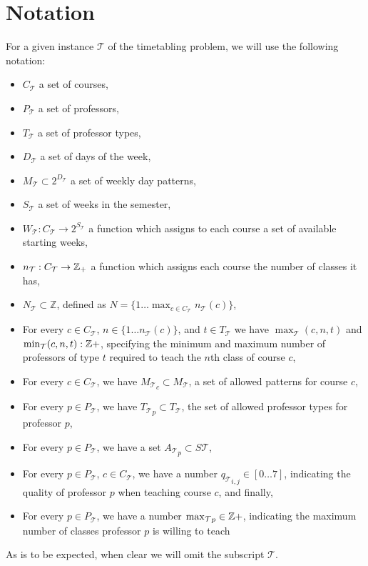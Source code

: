 \section{Notation}
For a given instance $\mathcal{T}$ of the timetabling problem, we will use the following notation:
\begin{itemize}
\item $C_{\mathcal{T}}$ a set of courses,
\item $P_{\mathcal{T}}$ a set of professors,
\item $T_{\mathcal{T}}$ a set of professor types,
\item $D_{\mathcal{T}}$ a set of days of the week,
\item $M_{\mathcal{T}} \subset 2^{D_\mathcal{T}}$ a set of weekly day patterns,
\item $S_{\mathcal{T}}$ a set of weeks in the semester,
\item $W_{\mathcal{T}} : C_{\mathcal{T}} \to 2^{S_\mathcal{T}}$ a function which assigns to each course a set of available starting weeks,
\item $n_\mathcal{T}: C_\mathcal{T} \to \mathbb{Z}_+$ a function which assigns each course the number of classes it has,
\item $N_\mathcal{T} \subset \mathbb{Z}$, defined as $N = \{1 \dots \max_{c \in C_\mathcal{T}} n_\mathcal{T}(c)\}$,
\item For every $c \in C_\mathcal{T}$, $n \in \{1 \dots n_\mathcal{T}(c)\}$, and $t \in T_\mathcal{T}$ we have $\max_\mathcal{T}(c, n, t)$ and $\min_\mathcal{T}(c, n, t): \mathbb{Z}+$, specifying the minimum and maximum number of professors of type $t$ required to teach the $n$th class of course $c$,
\item For every $c \in C_\mathcal{T}$, we have ${M_\mathcal{T}}_c \subset M_\mathcal{T}$, a set of allowed patterns for course $c$,
\item For every $p \in P_\mathcal{T}$, we have ${T_\mathcal{T}}_p \subset T_\mathcal{T}$, the set of allowed professor types for professor $p$,
\item For every $p \in P_\mathcal{T}$, we have a set ${A_\mathcal{T}}_p \subset S \mathcal{T}$,
\item For every $p \in P_\mathcal{T}$, $c \in C_\mathcal{T}$, we have a number ${q_\mathcal{T}}_{i, j} \in [0 \dots 7]$, indicating the quality of professor $p$ when teaching course $c$, and finally,
\item For every $p \in P_\mathcal{T}$, we have a number ${\max_{\mathcal{T}}}_p \in \mathbb{Z}+$, indicating the maximum number of classes professor $p$ is willing to teach
\end{itemize}

As is to be expected, when clear we will omit the subscript $\mathcal{T}$.
